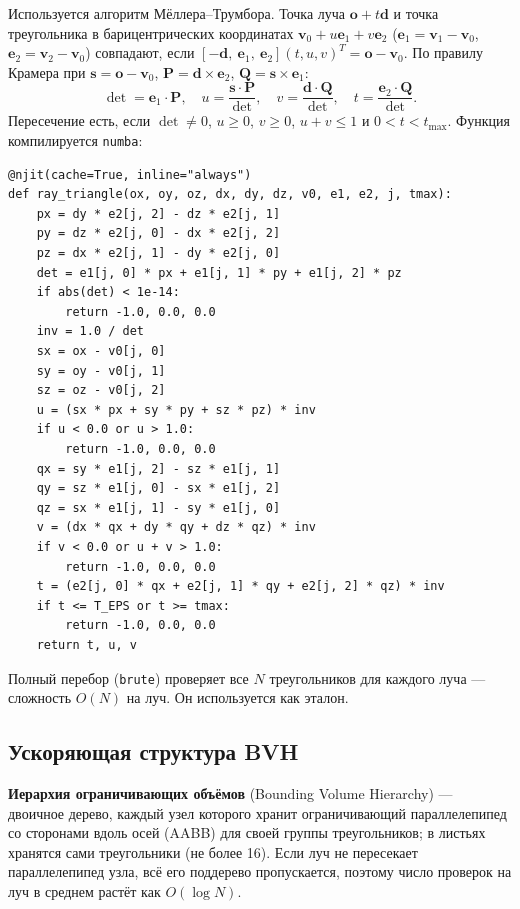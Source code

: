 \documentclass[12pt,a4paper]{article}
\newcommand{\vect}[1]{\mathbf{#1}}
\begin{document}
Используется алгоритм Мёллера–Трумбора. Точка луча $\vect o + t\vect d$ и точка треугольника в барицентрических
координатах $\vect v_0 + u\vect e_1 + v\vect e_2$ ($\vect e_1 = \vect v_1-\vect v_0$, $\vect e_2 = \vect v_2-\vect v_0$)
совпадают, если $[-\vect d,\ \vect e_1,\ \vect e_2](t,u,v)^T = \vect o-\vect v_0$. По правилу Крамера при
$\vect s = \vect o-\vect v_0$, $\vect P = \vect d\times\vect e_2$, $\vect Q = \vect s\times\vect e_1$:
\begin{equation}
\det = \vect e_1\cdot\vect P,\quad u = \frac{\vect s\cdot\vect P}{\det},\quad v = \frac{\vect d\cdot\vect Q}{\det},\quad t = \frac{\vect e_2\cdot\vect Q}{\det}.
\end{equation}
Пересечение есть, если $\det\ne0$, $u\ge0$, $v\ge0$, $u+v\le1$ и $0<t<t_{\max}$. Функция компилируется \texttt{numba}:

\begin{lstlisting}
@njit(cache=True, inline="always")
def ray_triangle(ox, oy, oz, dx, dy, dz, v0, e1, e2, j, tmax):
    px = dy * e2[j, 2] - dz * e2[j, 1]
    py = dz * e2[j, 0] - dx * e2[j, 2]
    pz = dx * e2[j, 1] - dy * e2[j, 0]
    det = e1[j, 0] * px + e1[j, 1] * py + e1[j, 2] * pz
    if abs(det) < 1e-14:
        return -1.0, 0.0, 0.0
    inv = 1.0 / det
    sx = ox - v0[j, 0]
    sy = oy - v0[j, 1]
    sz = oz - v0[j, 2]
    u = (sx * px + sy * py + sz * pz) * inv
    if u < 0.0 or u > 1.0:
        return -1.0, 0.0, 0.0
    qx = sy * e1[j, 2] - sz * e1[j, 1]
    qy = sz * e1[j, 0] - sx * e1[j, 2]
    qz = sx * e1[j, 1] - sy * e1[j, 0]
    v = (dx * qx + dy * qy + dz * qz) * inv
    if v < 0.0 or u + v > 1.0:
        return -1.0, 0.0, 0.0
    t = (e2[j, 0] * qx + e2[j, 1] * qy + e2[j, 2] * qz) * inv
    if t <= T_EPS or t >= tmax:
        return -1.0, 0.0, 0.0
    return t, u, v
\end{lstlisting}

Полный перебор (\texttt{brute}) проверяет все $N$ треугольников для каждого луча — сложность $O(N)$ на луч.
Он используется как эталон.

\subsection{Ускоряющая структура BVH}

\textbf{Иерархия ограничивающих объёмов} (Bounding Volume Hierarchy) — двоичное дерево, каждый узел которого хранит
ограничивающий параллелепипед со сторонами вдоль осей (AABB) для своей группы треугольников; в листьях хранятся
сами треугольники (не более 16). Если луч не пересекает параллелепипед узла, всё его поддерево пропускается, поэтому
число проверок на луч в среднем растёт как $O(\log N)$.
\end{document}
